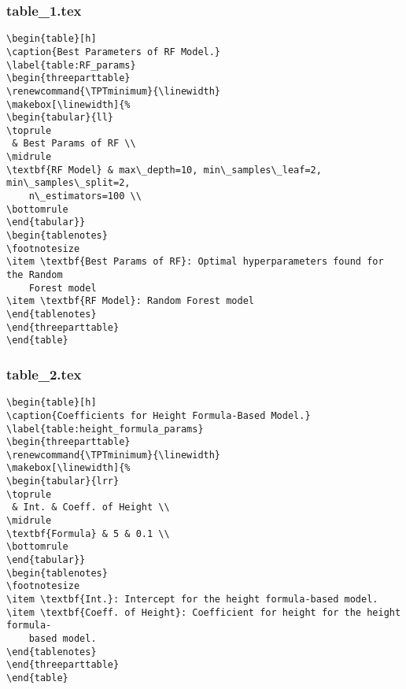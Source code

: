 \documentclass[11pt]{article}
\begin{document}
\subsubsection*{table\_1.tex}

\begin{Verbatim}[tabsize=4]
\begin{table}[h]
\caption{Best Parameters of RF Model.}
\label{table:RF_params}
\begin{threeparttable}
\renewcommand{\TPTminimum}{\linewidth}
\makebox[\linewidth]{%
\begin{tabular}{ll}
\toprule
 & Best Params of RF \\
\midrule
\textbf{RF Model} & max\_depth=10, min\_samples\_leaf=2, min\_samples\_split=2,
	n\_estimators=100 \\
\bottomrule
\end{tabular}}
\begin{tablenotes}
\footnotesize
\item \textbf{Best Params of RF}: Optimal hyperparameters found for the Random
	Forest model
\item \textbf{RF Model}: Random Forest model
\end{tablenotes}
\end{threeparttable}
\end{table}

\end{Verbatim}

\subsubsection*{table\_2.tex}

\begin{Verbatim}[tabsize=4]
\begin{table}[h]
\caption{Coefficients for Height Formula-Based Model.}
\label{table:height_formula_params}
\begin{threeparttable}
\renewcommand{\TPTminimum}{\linewidth}
\makebox[\linewidth]{%
\begin{tabular}{lrr}
\toprule
 & Int. & Coeff. of Height \\
\midrule
\textbf{Formula} & 5 & 0.1 \\
\bottomrule
\end{tabular}}
\begin{tablenotes}
\footnotesize
\item \textbf{Int.}: Intercept for the height formula-based model.
\item \textbf{Coeff. of Height}: Coefficient for height for the height formula-
	based model.
\end{tablenotes}
\end{threeparttable}
\end{table}

\end{Verbatim}
\end{document}
